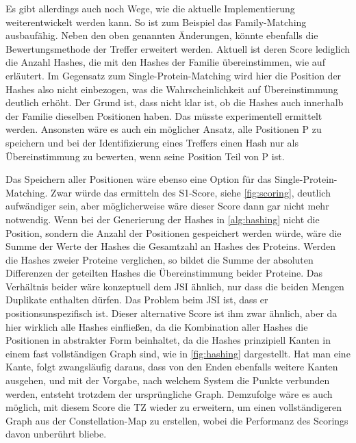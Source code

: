         Es gibt allerdings auch noch Wege, wie die aktuelle Implementierung weiterentwickelt werden kann. So ist zum Beispiel das Family-Matching ausbaufähig. Neben den oben genannten Änderungen, könnte ebenfalls die Bewertungsmethode der Treffer erweitert werden. Aktuell ist deren Score lediglich die Anzahl Hashes, die mit den Hashes der Familie übereinstimmen, wie auf  erläutert. Im Gegensatz zum Single-Protein-Matching wird hier die Position der Hashes also nicht einbezogen, was die Wahrscheinlichkeit auf Übereinstimmung deutlich erhöht. Der Grund ist, dass nicht klar ist, ob die Hashes auch innerhalb der Familie dieselben Positionen haben. Das müsste experimentell ermittelt werden. Ansonsten wäre es auch ein möglicher Ansatz, alle Positionen P zu speichern und bei der Identifizierung eines Treffers einen Hash nur als Übereinstimmung zu bewerten, wenn seine Position Teil von P ist.

        Das Speichern aller Positionen wäre ebenso eine Option für das Single-Protein-Matching. Zwar würde das ermitteln des S1-Score, siehe \autoref{fig:scoring}, deutlich aufwändiger sein, aber möglicherweise wäre dieser Score dann gar nicht mehr notwendig. Wenn bei der Generierung der Hashes in \autoref{alg:hashing} nicht die Position, sondern die Anzahl der Positionen gespeichert werden würde, wäre die Summe der Werte der Hashes die Gesamtzahl an Hashes des Proteins. Werden die Hashes zweier Proteine verglichen, so bildet die Summe der absoluten Differenzen der geteilten Hashes die Übereinstimmung beider Proteine. Das Verhältnis beider wäre konzeptuell dem \ac{JSI} ähnlich, nur dass die beiden Mengen Duplikate enthalten dürfen. Das Problem beim \ac{JSI} ist, dass er positionsunspezifisch ist. Dieser alternative Score ist ihm zwar ähnlich, aber da hier wirklich alle Hashes einfließen, da die Kombination aller Hashes die Positionen in abstrakter Form beinhaltet, da die Hashes prinzipiell Kanten in einem fast vollständigen Graph sind, wie in \autoref{fig:hashing} dargestellt. Hat man eine Kante, folgt zwangsläufig daraus, dass von den Enden ebenfalls weitere Kanten ausgehen, und mit der Vorgabe, nach welchem System die Punkte verbunden werden, entsteht trotzdem der ursprüngliche Graph. Demzufolge wäre es auch möglich, mit diesem Score die \ac{TZ} wieder zu erweitern, um einen vollständigeren Graph aus der Constellation-Map zu erstellen, wobei die Performanz des Scorings davon unberührt bliebe.

